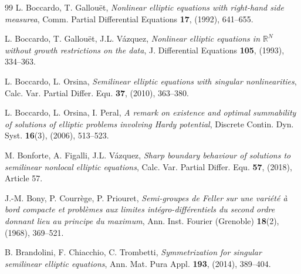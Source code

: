 \documentclass[11pt,a4paper]{amsart}
\theoremstyle{definition}
\theoremstyle{plain}
\numberwithin{equation}{section}
\begin{document}
{\begin{thebibliography}{99}
L. Boccardo, T. Gallou\"{e}t, 
{\em Nonlinear elliptic equations with right-hand side measurea}, Comm. Partial Differential Equations {\bf 17}, (1992), 641--655.

L. Boccardo, T. Gallou\"{e}t, J.L. V\'{a}zquez, 
{\em Nonlinear elliptic equations in $\mathbb{R}^{N}$ without growth restrictions on the data}, 
J. Differential Equations {\bf 105}, (1993), 334--363.

L. Boccardo, L. Orsina, 
{\em Semilinear elliptic equations with singular nonlinearities}, Calc. Var. Partial Differ. Equ. {\bf 37}, (2010), 363--380.

L. Boccardo, L. Orsina, I. Peral, 
{\em A remark on existence and optimal summability of solutions of elliptic problems involving Hardy potential}, 
Discrete Contin. Dyn. Syst. {\bf 16}(3), (2006), 513--523.

M. Bonforte, A. Figalli, J.L. V\'{a}zquez,
{\em Sharp boundary behaviour of solutions to semilinear nonlocal elliptic equations},
Calc. Var.  Partial Differ. Equ. {\bf 57}, (2018), Article 57.

J.-M. Bony, P. Courrège, P. Priouret, 
{\em Semi-groupes de Feller sur une variété à bord compacte et problèmes aux limites intégro-différentiels du second ordre donnant lieu au principe du maximum},
Ann. Inst. Fourier (Grenoble) {\bf 18}(2), (1968), 369--521.


B. Brandolini, F. Chiacchio, C. Trombetti, 
{\em Symmetrization for singular semilinear elliptic equations},
Ann. Mat. Pura Appl. {\bf 193}, (2014), 389--404.





\end{thebibliography}}
\end{document}
